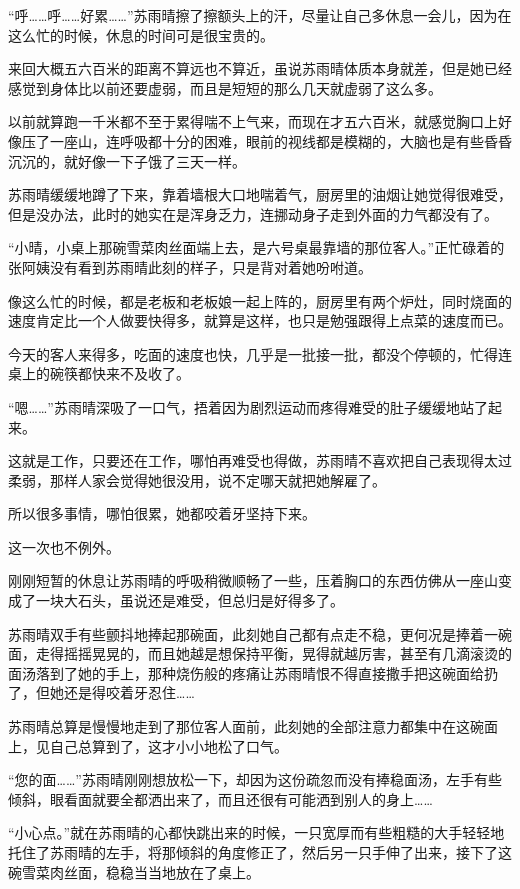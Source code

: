 “呼……呼……好累……”苏雨晴擦了擦额头上的汗，尽量让自己多休息一会儿，因为在这么忙的时候，休息的时间可是很宝贵的。

来回大概五六百米的距离不算远也不算近，虽说苏雨晴体质本身就差，但是她已经感觉到身体比以前还要虚弱，而且是短短的那么几天就虚弱了这么多。

以前就算跑一千米都不至于累得喘不上气来，而现在才五六百米，就感觉胸口上好像压了一座山，连呼吸都十分的困难，眼前的视线都是模糊的，大脑也是有些昏昏沉沉的，就好像一下子饿了三天一样。

苏雨晴缓缓地蹲了下来，靠着墙根大口地喘着气，厨房里的油烟让她觉得很难受，但是没办法，此时的她实在是浑身乏力，连挪动身子走到外面的力气都没有了。

“小晴，小桌上那碗雪菜肉丝面端上去，是六号桌最靠墙的那位客人。”正忙碌着的张阿姨没有看到苏雨晴此刻的样子，只是背对着她吩咐道。

像这么忙的时候，都是老板和老板娘一起上阵的，厨房里有两个炉灶，同时烧面的速度肯定比一个人做要快得多，就算是这样，也只是勉强跟得上点菜的速度而已。

今天的客人来得多，吃面的速度也快，几乎是一批接一批，都没个停顿的，忙得连桌上的碗筷都快来不及收了。

“嗯……”苏雨晴深吸了一口气，捂着因为剧烈运动而疼得难受的肚子缓缓地站了起来。

这就是工作，只要还在工作，哪怕再难受也得做，苏雨晴不喜欢把自己表现得太过柔弱，那样人家会觉得她很没用，说不定哪天就把她解雇了。

所以很多事情，哪怕很累，她都咬着牙坚持下来。

这一次也不例外。

刚刚短暂的休息让苏雨晴的呼吸稍微顺畅了一些，压着胸口的东西仿佛从一座山变成了一块大石头，虽说还是难受，但总归是好得多了。

苏雨晴双手有些颤抖地捧起那碗面，此刻她自己都有点走不稳，更何况是捧着一碗面，走得摇摇晃晃的，而且她越是想保持平衡，晃得就越厉害，甚至有几滴滚烫的面汤落到了她的手上，那种烧伤般的疼痛让苏雨晴恨不得直接撒手把这碗面给扔了，但她还是得咬着牙忍住……

苏雨晴总算是慢慢地走到了那位客人面前，此刻她的全部注意力都集中在这碗面上，见自己总算到了，这才小小地松了口气。

“您的面……”苏雨晴刚刚想放松一下，却因为这份疏忽而没有捧稳面汤，左手有些倾斜，眼看面就要全都洒出来了，而且还很有可能洒到别人的身上……

“小心点。”就在苏雨晴的心都快跳出来的时候，一只宽厚而有些粗糙的大手轻轻地托住了苏雨晴的左手，将那倾斜的角度修正了，然后另一只手伸了出来，接下了这碗雪菜肉丝面，稳稳当当地放在了桌上。

